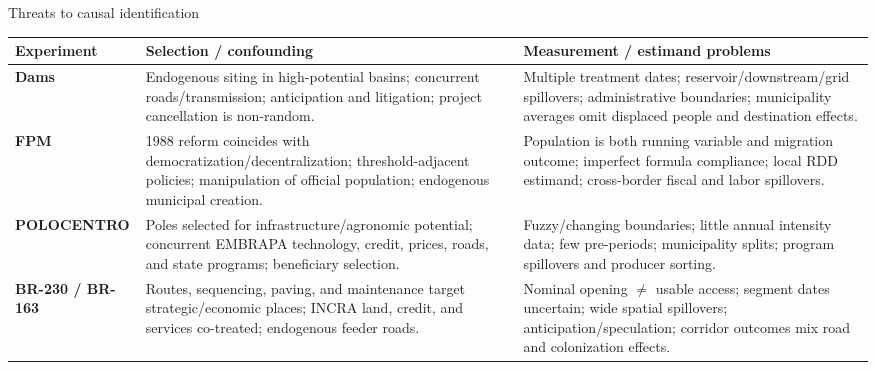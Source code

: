 \documentclass[aspectratio=169,10pt]{beamer}
\begin{document}
\begin{frame}{Threats to causal identification}
\scriptsize
\renewcommand{\arraystretch}{1.22}
\begin{tabularx}{\textwidth}{L{2.05cm}YY}
\toprule
\textbf{Experiment} & \textbf{Selection / confounding} & \textbf{Measurement / estimand problems} \\
\midrule
\textbf{Dams} & Endogenous siting in high-potential basins; concurrent roads/transmission; anticipation and litigation; project cancellation is non-random. & Multiple treatment dates; reservoir/downstream/grid spillovers; administrative boundaries; municipality averages omit displaced people and destination effects. \\
\textbf{FPM} & 1988 reform coincides with democratization/decentralization; threshold-adjacent policies; manipulation of official population; endogenous municipal creation. & Population is both running variable and migration outcome; imperfect formula compliance; local RDD estimand; cross-border fiscal and labor spillovers. \\
\textbf{POLOCENTRO} & Poles selected for infrastructure/agronomic potential; concurrent EMBRAPA technology, credit, prices, roads, and state programs; beneficiary selection. & Fuzzy/changing boundaries; little annual intensity data; few pre-periods; municipality splits; program spillovers and producer sorting. \\
\textbf{BR-230 / BR-163} & Routes, sequencing, paving, and maintenance target strategic/economic places; INCRA land, credit, and services co-treated; endogenous feeder roads. & Nominal opening $\neq$ usable access; segment dates uncertain; wide spatial spillovers; anticipation/speculation; corridor outcomes mix road and colonization effects. \\
\bottomrule
\end{tabularx}
\end{frame}
\end{document}
